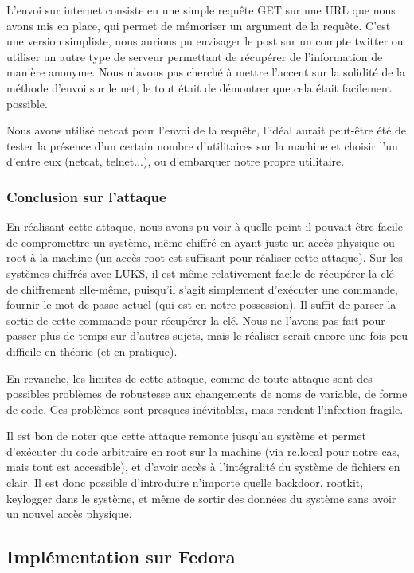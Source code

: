 \documentclass[12pt,a4paper]{article}
\begin{document}
L'envoi sur internet consiste en une simple requête GET sur une URL que nous
avons mis en place, qui permet de mémoriser un argument de la requête. C'est une
version simpliste, nous aurions pu envisager le post sur un compte twitter ou
utiliser un autre type de serveur permettant de récupérer de l'information de
manière anonyme. Nous n'avons pas cherché à mettre l'accent sur la solidité de
la méthode d'envoi sur le net, le tout était de démontrer que cela était
facilement possible.

Nous avons utilisé netcat pour l'envoi de la requête, l'idéal aurait peut-être
été de tester la présence d'un certain nombre d'utilitaires sur la machine et
choisir l'un d'entre eux (netcat, telnet...), ou d'embarquer notre propre
utilitaire.

\subsubsection*{Conclusion sur l'attaque}

En réalisant cette attaque, nous avons pu voir à quelle point il pouvait être
facile de compromettre un système, même chiffré en ayant juste un accès physique
ou root à la machine (un accès root est suffisant pour réaliser cette attaque).
Sur les systèmes chiffrés avec LUKS, il est même relativement facile de récupérer
la clé de chiffrement elle-même, puisqu'il s'agit simplement d'exécuter une
commande, fournir le mot de passe actuel (qui est en notre possession). Il 
suffit de parser la sortie de cette commande pour récupérer la clé. Nous ne 
l'avons pas fait pour passer plus de temps sur d'autres sujets, mais le réaliser
serait encore une fois peu difficile en théorie (et en pratique).

En revanche, les limites de cette attaque, comme de toute attaque sont des
possibles problèmes de robustesse aux changements de noms de variable, de forme
de code. Ces problèmes sont presques inévitables, mais rendent l'infection
fragile.

Il est bon de noter que cette attaque remonte jusqu'au système et permet
d'exécuter du code arbitraire en root sur la machine (via rc.local pour notre 
cas, mais tout est accessible), et d'avoir accès à l'intégralité du système de
fichiers en clair. Il est donc possible d'introduire n'importe quelle backdoor,
rootkit, keylogger dans le système, et même de sortir des données du système sans
avoir un nouvel accès physique.

\subsection{Implémentation sur Fedora}
\end{document}

